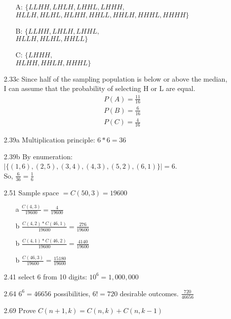 \documentclass[11pt]{article}
\begin{document}
\begin{enumerate}
\begin{enumerate}
            \item[A:] $\{LLHH, LHLH, LHHL, LHHH,$ \\
                        $HLLH, HLHL, HLHH, HHLL, HHLH, HHHL, HHHH\}$
            \item[B:] $\{LLHH, LHLH, LHHL,$ \\
                        $HLLH, HLHL, HHLL\}$
            \item[C:] $\{LHHH,$ \\
                        $HLHH, HHLH, HHHL\}$
        \end{enumerate}
        \item[2.33c] Since half of the sampling population is below or above the median,\\
                    I can assume that the probability of selecting H or L are equal.
                    \begin{align*}
                    P(A) = \frac{11}{16} \\
                    P(B) = \frac{6}{16} \\
                    P(C) = \frac{4}{16}
                    \end{align*}
        \item[2.39a] Multiplication principle: $6*6 = 36$
        \item[2.39b] By enumeration: $|\{(1,6), (2,5), (3,4), (4,3), (5,2), (6,1)\}| = 6$. \\
                    So, $\frac{6}{36} = \frac{1}{6}$
        \item[2.51] Sample space $= C(50,3) = 19600$
        \begin{enumerate}
            \item[a] $\frac{C(4,3)}{19600} = \frac{4}{19600}$
            \item[b] $\frac{C(4,2)*C(46,1)}{19600} = \frac{276}{19600}$
            \item[b] $\frac{C(4,1)*C(46,2)}{19600} = \frac{4140}{19600}$
            \item[b] $\frac{C(46,3)}{19600} = \frac{15180}{19600}$
        \end{enumerate}
        \newpage
        \item[2.41] select 6 from 10 digits: $10^6 = 1,000,000$
        \item[2.64] $6^6 = 46656$ possibilities, $6! = 720$ desirable outcomes. $\frac{720}{46656}$
        \item[2.69] Prove $C(n + 1,k) = C(n,k) + C(n,k - 1)$
        \begin{description}

\end{description}
\end{enumerate}
\end{document}
